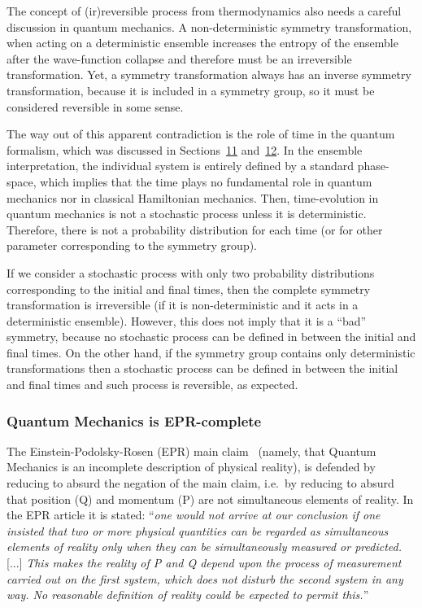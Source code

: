\documentclass[11pt]{book}
\begin{document}
The concept of (ir)reversible process from thermodynamics also needs a
careful discussion in quantum mechanics. A non-deterministic symmetry
transformation, when acting on a deterministic ensemble increases the
entropy of the ensemble after the wave-function collapse and therefore
must be an irreversible transformation. Yet, a symmetry transformation
always has an inverse symmetry transformation, because it is included in
a symmetry group, so it must be considered reversible in some sense.

The way out of this apparent contradiction is the role of time in the
quantum formalism, which was discussed in
Sections~\protect\hyperlink{sec:stochastic}{11}
and~\protect\hyperlink{sec:timetranslation}{12}. In the ensemble
interpretation, the individual system is entirely defined by a standard
phase-space, which implies that the time plays no fundamental role in
quantum mechanics nor in classical Hamiltonian mechanics. Then,
time-evolution in quantum mechanics is not a stochastic process unless
it is deterministic. Therefore, there is not a probability distribution
for each time (or for other parameter corresponding to the symmetry
group).

If we consider a stochastic process with only two probability
distributions corresponding to the initial and final times, then the
complete symmetry transformation is irreversible (if it is
non-deterministic and it acts in a deterministic ensemble). However,
this does not imply that it is a ``bad'' symmetry, because no stochastic
process can be defined in between the initial and final times. On the
other hand, if the symmetry group contains only deterministic
transformations then a stochastic process can be defined in between the
initial and final times and such process is reversible, as expected.

\hypertarget{quantum-mechanics-is-epr-complete}{%
\subsubsection{Quantum Mechanics is
EPR-complete}\label{quantum-mechanics-is-epr-complete}}

The Einstein-Podolsky-Rosen (EPR) main
claim~\cite{Einstein1935Can} (namely, that Quantum Mechanics is an incomplete
description of physical reality), is defended by reducing to absurd the
negation of the main claim, i.e.~by reducing to absurd that position (Q)
and momentum (P) are not simultaneous elements of reality. In the EPR
article it is stated: ``\emph{one would not arrive at our conclusion if
one insisted that two or more physical quantities can be regarded as
simultaneous elements of reality only when they can be simultaneously
measured or predicted.}{[}...{]}\emph{ This makes the reality of P and Q
depend upon the process of measurement carried out on the first system,
which does not disturb the second system in any way. No reasonable
definition of reality could be expected to permit this.}''
\end{document}
